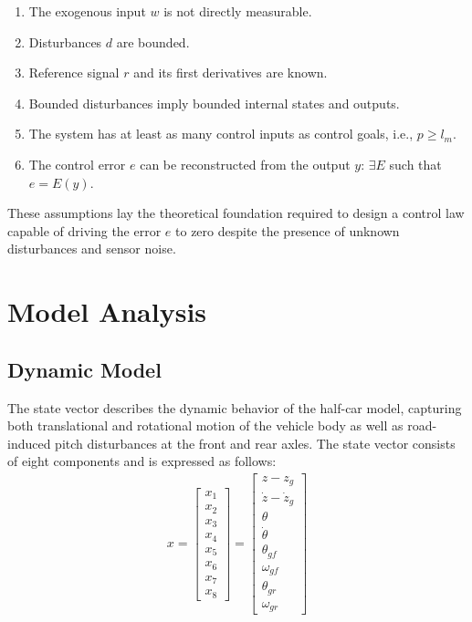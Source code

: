 \documentclass[]{report}
\begin{document}
\begin{enumerate}
	\item The exogenous input $w$ is not directly measurable.
	\item Disturbances $d$ are bounded.
	\item Reference signal $r$ and its first derivatives are known.
	\item Bounded disturbances imply bounded internal states and outputs.
	\item The system has at least as many control inputs as control goals, i.e., $p \geq l_m$.
	\item The control error $e$ can be reconstructed from the output $y$: $\exists E$ such that $e = E(y)$.
\end{enumerate}

These assumptions lay the theoretical foundation required to design a control law capable of driving the error $e$ to zero despite the presence of unknown disturbances and sensor noise.

\section{Model Analysis}
\subsection{Dynamic Model}

The state vector describes the dynamic behavior of the half-car model, capturing both translational and rotational motion of the vehicle body as well as road-induced pitch disturbances at the front and rear axles. The state vector consists of eight components and is expressed as follows:
\begin{align}
	x = \begin{bmatrix}
		x_1 \\ x_2 \\ x_3 \\ x_4 \\ x_5 \\ x_6 \\ x_7 \\ x_8
	\end{bmatrix} =
	\begin{bmatrix}
		z - z_g \\
		\dot{z} - \dot{z}_g \\
		\theta \\
		\dot{\theta} \\
		\theta_{gf} \\
		\omega_{gf} \\
		\theta_{gr} \\
		\omega_{gr}
	\end{bmatrix}
\end{align}
\end{document}
